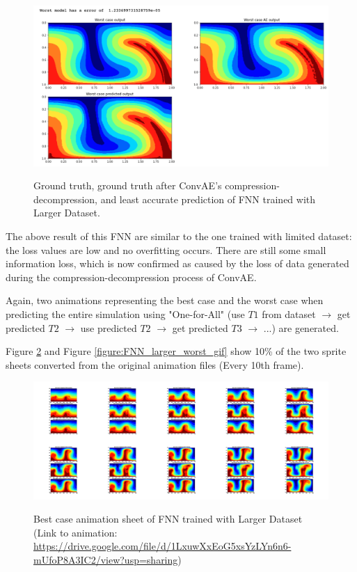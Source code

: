 \begin{figure}[H]
    \caption{Ground truth, ground truth after ConvAE's compression-decompression, and least accurate prediction of FNN trained with Larger Dataset.}
    \includegraphics[scale=0.5]{figures/mantle_convection_images/larger_dataset/FNN_Worst.png}
    \label{figure:FNN_larger_worst}
\end{figure}

The above result of this FNN are similar to the one trained with limited dataset: the loss values are low and no overfitting occurs. There are still some small information loss, which is now confirmed as caused by the loss of data generated during the compression-decompression process of ConvAE.

Again, two animations representing the best case and the worst case when predicting the entire simulation using "One-for-All" (use $T1$ from dataset $\rightarrow$ get predicted $T2$ $\rightarrow$ use predicted $T2$ $\rightarrow$ get predicted $T3$ $\rightarrow$ ...) are generated.

Figure \ref{figure:FNN_larger_best_gif} and Figure \ref{figure:FNN_larger_worst_gif} show 10\% of the two sprite sheets converted from the original animation files (Every 10th frame).

\begin{figure}[H]
    \centering
    \caption{Best case animation sheet of FNN trained with Larger Dataset (Link to animation: \url{https://drive.google.com/file/d/1LxuwXxEoG5xsYzLYn6n6-mUfoP8A3IC2/view?usp=sharing})}
    \includegraphics[scale=0.10]{figures/mantle_convection_images/larger_dataset/FNN_Best_GIF_sheet.png}
    \label{figure:FNN_larger_best_gif}
\end{figure}

